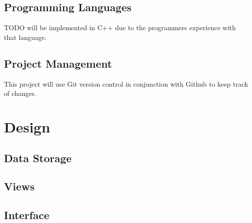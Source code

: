 \documentclass[12pt,a4paper]{article}
\begin{document}
\subsection{Programming Languages}
TODO will be implemented in C++ due to the programmers experience with that language.

\subsection{Project Management}
This project will use Git version control in conjunction with Github to keep track of changes.

\section{Design}
\subsection{Data Storage}\label{sec:Data Storage}
\subsubsection{}

\subsubsection{}

\subsubsection{}

\subsection{Views}
\subsubsection{}

\subsubsection{}

\subsubsection{}

\subsection{Interface}
\end{document}
